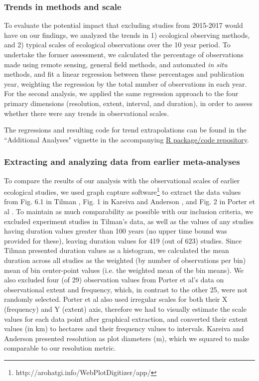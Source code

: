 \documentclass[12pt]{article}
\begin{document}
\subsubsection*{Trends in methods and scale}
To evaluate the potential impact that excluding studies from 2015-2017 would have on our findings, we analyzed the trends in 1) ecological observing methods, and 2) typical scales of ecological observations over the 10 year period. To undertake the former assessment, we calculated the percentage of observations made using remote sensing, general field methods, and automated \emph{in situ} methods, and fit a linear regression between these percentages and publication year, weighting the regression by the total number of observations in each year. For the second analysis, we applied the same regression approach to the four primary dimensions (resolution, extent, interval, and duration), in order to assess whether there were any trends in observational scales.  

The regressions and resulting code for trend extrapolations can be found in the ``Additional Analyses" vignette in the accompanying \href{https://github.com/agroimpacts/ecoscales}{R package/code repository}.

\subsubsection*{Extracting and analyzing data from earlier meta-analyses}
To compare the results of our analysis with the observational scales of earlier ecological studies, we used graph capture software\footnote{http://arohatgi.info/WebPlotDigitizer/app/} to extract the data values from Fig. 6.1 in Tilman \cite{tilman_ecological_1989}, Fig. 1 in Kareiva and Anderson \cite{kareiva_spatial_1988}, and Fig. 2 in Porter et al \cite{porter_crop_2005}. To maintain as much comparability as possible with our inclusion criteria, we excluded experiment studies in Tilman's data, as well as the values of any studies having duration values greater than 100 years (no upper time bound was provided for these), leaving duration values for 419 (out of 623) studies. Since Tilman presented duration values as a histogram, we calculated the mean duration across all studies as the weighted (by number of observations per bin) mean of bin center-point values (i.e. the weighted mean of the bin means).  We also excluded four (of 29) observation values from Porter et al's data on observational extent and frequency, which, in contrast to the other 25, were not randomly selected. Porter et al also used irregular scales for both their X (frequency) and Y (extent) axis, therefore we had to visually estimate the scale values for each data point after graphical extraction, and converted their extent values (in km) to hectares and their frequency values to intervals. Kareiva and Anderson presented resolution as plot diameters (m), which we squared to make comparable to our resolution metric.  
\end{document}
